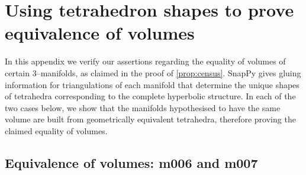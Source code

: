 \documentclass[a4paper]{gtart}
\theoremstyle{definition}
\theoremstyle{remark}
\numberwithin{equation}{section}
\begin{document}
\address{Marc Kegel\\Universidad de Sevilla, Dpto.\ de Algebra,
	Avda.\ Reina Mercedes s/n,
	41012 Sevilla, Spain\\
	{kegelmarc87@gmail.com\\-----}}

\address{Arunima Ray\\School of Mathematics and Statistics, The University of Melbourne, VIC 3010, Australia\\{aru.ray@unimelb.edu.au\\-----}}

\address{Jonathan Spreer\\School of Mathematics and Statistics F07, The University of Sydney, NSW 2006 Australia\\{jonathan.spreer@sydney.edu.au\\-----}}

\address{Em Thompson\\School of Mathematics, Monash University, Vic 3800 Australia\\{em.thompson.maths@gmail.com\\-----}}

\address{Stephan Tillmann\\School of Mathematics and Statistics F07, The University of Sydney, NSW 2006 Australia\\{stephan.tillmann@sydney.edu.au}}

\Addresses

\newpage

\appendix
\section{Using tetrahedron shapes to prove equivalence of volumes}\label{app:shapes}

In this appendix we verify our assertions regarding the equality of volumes of certain 3--manifolds, as claimed in the proof of \cref{prop:census}. 
SnapPy \cite{snappy} gives gluing information for triangulations of each 
manifold that determine the unique shapes of tetrahedra corresponding to the complete hyperbolic structure. In each of the two cases below, we show that the manifolds hypothesised to have the 
same volume are built from geometrically equivalent tetrahedra, therefore 
proving the claimed equality of volumes.

\subsection{Equivalence of volumes: m006 and m007} 
\end{document}
